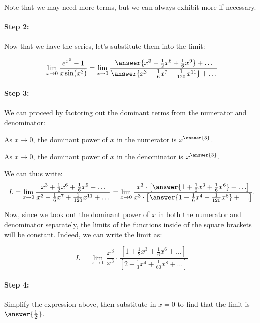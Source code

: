 \documentclass{ximera}
\begin{document}
\begin{exercise}
\begin{exercise}
Note that we may need more terms, but we can always exhibit more if necessary.  

\paragraph{Step 2:} Now that we have the series, let's substitute them into the limit:

\[
\lim_{x \to 0} \frac{e^{x^3}-1}{x \sin(x^2)} = \lim_{x \to 0} \frac{  \answer{x^3+\frac{1}{2}x^6+\frac{1}{6}x^9} +\ldots}{\answer{x^3-\frac{1}{6}x^7+\frac{1}{120}x^{11}} +\ldots}
\]

\paragraph{Step 3:} We can proceed by factoring out the dominant terms from the numerator and denominator:

As $x \to 0$, the dominant power of $x$ in the numerator is $x^{\answer{3}}$.

As $x \to 0$, the dominant power of $x$ in the denominator is $x^{\answer{3}}$.

\begin{exercise}
We can thus write:
\[
L = \lim_{x \to 0} \frac{ x^3+\frac{1}{2}x^6+\frac{1}{6}x^9 +\ldots}{x^3-\frac{1}{6}x^7+\frac{1}{120}x^{11} +\ldots}  = \lim_{x \to 0} \frac{ x^3 \cdot \left[\answer{1+\frac{1}{2}x^3+\frac{1}{6}x^6} +\ldots\right]}{x^3 \cdot \left[\answer{1-\frac{1}{6}x^4+\frac{1}{120}x^{8}} +\ldots\right]}.
\]

\begin{exercise}
 Now, since we took out the dominant power of $x$ in both the numerator and denominator separately, the limits of the functions inside of the square brackets will be constant.  Indeed, we can write the limit as:

\[
L = \lim_{x \to 0} \frac{x^3}{x^3} \cdot \frac{\left[1+\frac{1}{2}x^3+\frac{1}{6}x^6+\ldots \right]}{\left[2-\frac{1}{3}x^4+\frac{1}{60}x^8 +\ldots \right]}
\]

\paragraph{Step 4:} Simplify the expression above, then substitute in $x=0$ to find that the limit is $\answer{\frac{1}{2}}$.


\end{exercise}
\end{exercise}
\end{exercise}
\end{exercise}
\end{document}
